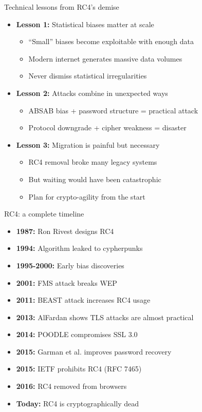 \documentclass[aspectratio=169, lualatex, handout]{beamer}
\begin{document}
\begin{frame}{Technical lessons from RC4's demise}
	\begin{itemize}[<+->]
		\item \textbf{Lesson 1:} Statistical biases matter at scale
		      \begin{itemize}[<+->]
			      \item ``Small'' biases become exploitable with enough data
			      \item Modern internet generates massive data volumes
			      \item Never dismiss statistical irregularities
		      \end{itemize}
		\item \textbf{Lesson 2:} Attacks combine in unexpected ways
		      \begin{itemize}[<+->]
			      \item ABSAB bias + password structure = practical attack
			      \item Protocol downgrade + cipher weakness = disaster
		      \end{itemize}
		\item \textbf{Lesson 3:} Migration is painful but necessary
		      \begin{itemize}[<+->]
			      \item RC4 removal broke many legacy systems
			      \item But waiting would have been catastrophic
			      \item Plan for crypto-agility from the start
		      \end{itemize}
	\end{itemize}
\end{frame}

\begin{frame}{RC4: a complete timeline}
	\begin{itemize}[<+->]
		\item \textbf{1987:} Ron Rivest designs RC4
		\item \textbf{1994:} Algorithm leaked to cypherpunks
		\item \textbf{1995-2000:} Early bias discoveries
		\item \textbf{2001:} FMS attack breaks WEP
		\item \textbf{2011:} BEAST attack increases RC4 usage
		\item \textbf{2013:} AlFardan shows TLS attacks are almost practical
		\item \textbf{2014:} POODLE compromises SSL 3.0
		\item \textbf{2015:} Garman et al. improves password recovery
		\item \textbf{2015:} IETF prohibits RC4 (RFC 7465)
		\item \textbf{2016:} RC4 removed from browsers
		\item \textbf{Today:} RC4 is cryptographically dead
	\end{itemize}
\end{frame}
\end{document}
